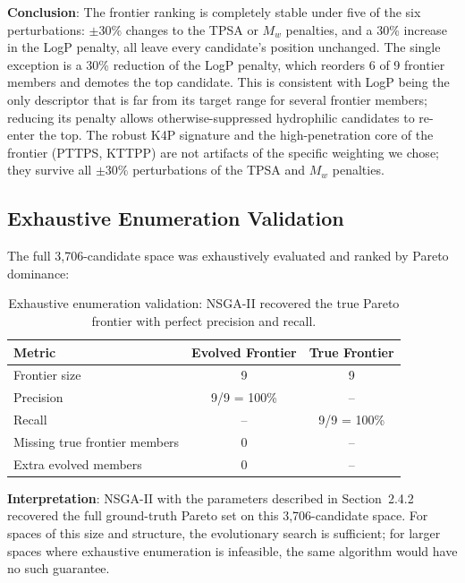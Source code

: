 \documentclass[11pt,letterpaper]{article}
\begin{document}
\textbf{Conclusion}: The frontier ranking is completely stable under five of the six perturbations: $\pm 30\%$ changes to the TPSA or $M_w$ penalties, and a 30\% increase in the LogP penalty, all leave every candidate's position unchanged. The single exception is a 30\% reduction of the LogP penalty, which reorders 6 of 9 frontier members and demotes the top candidate. This is consistent with LogP being the only descriptor that is far from its target range for several frontier members; reducing its penalty allows otherwise-suppressed hydrophilic candidates to re-enter the top. The robust K4P signature and the high-penetration core of the frontier (PTTPS, KTTPP) are not artifacts of the specific weighting we chose; they survive all $\pm 30\%$ perturbations of the TPSA and $M_w$ penalties.

\subsection{Exhaustive Enumeration Validation}

The full 3,706-candidate space was exhaustively evaluated and ranked by Pareto dominance:

\begin{table}[H]
\centering
\small
\begin{tabular}{lcc}
\toprule
\textbf{Metric} & \textbf{Evolved Frontier} & \textbf{True Frontier} \\
\midrule
Frontier size & 9 & 9 \\
Precision & 9/9 = 100\% & -- \\
Recall & -- & 9/9 = 100\% \\
Missing true frontier members & 0 & -- \\
Extra evolved members & 0 & -- \\
\bottomrule
\end{tabular}
\caption{Exhaustive enumeration validation: NSGA-II recovered the true Pareto frontier with perfect precision and recall.}
\label{tab:validation}
\end{table}

\textbf{Interpretation}: NSGA-II with the parameters described in Section~2.4.2 recovered the full ground-truth Pareto set on this 3,706-candidate space. For spaces of this size and structure, the evolutionary search is sufficient; for larger spaces where exhaustive enumeration is infeasible, the same algorithm would have no such guarantee.

\end{document}
